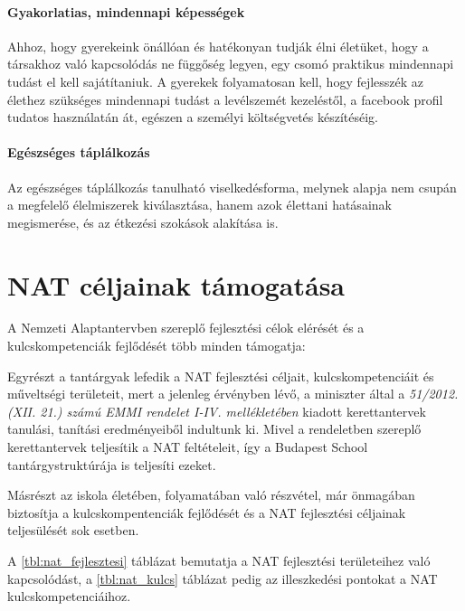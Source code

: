 \paragraph{Gyakorlatias, mindennapi képességek}

Ahhoz, hogy gyerekeink önállóan és hatékonyan tudják élni életüket, hogy a társakhoz való kapcsolódás ne függőség legyen, egy csomó praktikus mindennapi tudást el kell sajátítaniuk. A gyerekek folyamatosan kell, hogy fejlesszék az élethez szükséges mindennapi tudást a levélszemét kezeléstől, a facebook profil tudatos használatán át, egészen a személyi költségvetés készítéséig.

\paragraph{Egészséges táplálkozás}

Az egészséges táplálkozás tanulható viselkedésforma, melynek alapja nem csupán a megfelelő élelmiszerek kiválasztása, hanem azok élettani hatásainak megismerése, és az étkezési szokások alakítása is.

\section{NAT céljainak támogatása}

A Nemzeti Alaptantervben szereplő fejlesztési célok elérését és a kulcskompetenciák fejlődését több minden támogatja:

Egyrészt a tantárgyak lefedik a NAT fejlesztési céljait, kulcskompetenciáit és műveltségi területeit, mert a jelenleg érvényben lévő, a miniszter által a \emph{51/2012. (XII. 21.) számú EMMI rendelet I-IV. mellékletében} kiadott kerettantervek\cite{ofi:kerettanterv} tanulási, tanítási eredményeiből indultunk ki. Mivel a rendeletben szereplő kerettantervek teljesítik a NAT feltételeit, így a Budapest School tantárgystruktúrája is teljesíti ezeket.

Másrészt az iskola életében, folyamatában való részvétel, már önmagában biztosítja a kulcskompentenciák fejlődését és a NAT fejlesztési céljainak teljesülését sok esetben.

A \ref{tbl:nat_fejlesztesi} táblázat bemutatja a NAT fejlesztési területeihez való kapcsolódást, a
\ref{tbl:nat_kulcs} táblázat pedig az illeszkedési pontokat a NAT kulcskompetenciáihoz.


